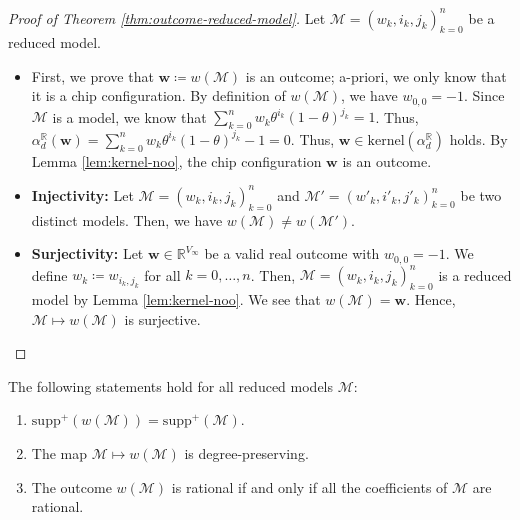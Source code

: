 \begin{proof}[Proof of Theorem \ref{thm:outcome-reduced-model}]
    Let \( \mathcal{M} = (w_k,i_k,j_k)_{k=0}^n \) be a reduced model. 

    \begin{itemize}
        \item First, we prove that \( \mathbf w \coloneqq w(\mathcal{M}) \) is an outcome; a-priori, we only know that it is a chip configuration. By definition of \( w(\mathcal{M}) \), we have \( w_{0,0} = -1 \). Since \( \mathcal{M} \) is a model, we know that \( \sum_{k=0}^n w_k \theta^{i_k} (1-\theta)^{j_k} = 1 \). Thus, \( \alpha_d^{\mathbb R}(\mathbf w) = \sum_{k=0}^n w_k \theta^{i_k} (1-\theta)^{j_k} -1 = 0 \). Thus, \( \mathbf{w} \in \mathrm{kernel}(\alpha_d^{\mathbb R}) \) holds. By Lemma \ref{lem:kernel-noo}, the chip configuration \( \mathbf w \) is an outcome.
        
        \item \textbf{Injectivity:} Let \( \mathcal{M} = (w_k,i_k,j_k)^n_{k=0} \) and \( \mathcal{M}' = (w'_k,i'_k,j'_k)^n_{k=0} \) be two distinct models. Then, we have \( w(\mathcal{M}) \neq w(\mathcal{M}') \).
        
        \item \textbf{Surjectivity:} Let \( \mathbf w \in \mathbb{R}^{V_\infty} \) be a valid real outcome with \( w_{0,0} = -1 \). We define \( w_k \coloneqq w_{i_k,j_k}  \) for all \( k = 0, \dots, n \).
        Then, \( \mathcal{M}= (w_k,i_k,j_k)^n_{k=0} \) is a reduced model by Lemma \ref{lem:kernel-noo}. We see that \( w(\mathcal{M}) = \mathbf w \). Hence, \( \mathcal{M} \mapsto w(\mathcal{M}) \) is surjective.
    \end{itemize}
\end{proof}

\begin{proposition}\label{prop:outcome-properties-bllaio}
    The following statements hold for all reduced models \( \mathcal{M} \):
    \begin{enumerate}
        \item \( \mathrm{supp}^+(w(\mathcal{M})) = \mathrm{supp}^+(\mathcal{M})\).
        \item The map \( \mathcal{M} \mapsto w(\mathcal{M}) \) is degree-preserving.
        \item The outcome \( w(\mathcal{M}) \) is rational if and only if all the coefficients of \( \mathcal{M} \) are rational.
    \end{enumerate}
\end{proposition}

